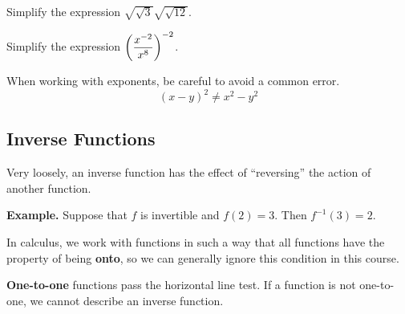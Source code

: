 \documentclass[12pt]{article}
\begin{document}
\Example Simplify the expression $\sqrt{\sqrt{3}}\sqrt{\sqrt{12}}$.

\newpage

\Example Simplify the expression $\displaystyle\left(\frac{x^{-2}}{x^8}\right)^{-2}$.

\vspace{20mm}

When working with exponents, be careful to avoid a common error.
$$(x-y)^2 \neq x^2-y^2$$

\vspace{5mm}

\subsection*{Inverse Functions}
Very loosely, an inverse function has the effect of ``reversing'' the action of another function.

\vspace{3mm}


\vspace{5mm}

\textbf{Example.} Suppose that $f$ is invertible and $f(2)=3$. Then $f^{-1}(3)=2$.

\vspace{5mm}


\vspace{5mm}

In calculus, we work with functions in such a way that all functions have the property of being \textbf{onto}, so we can generally ignore this condition in this course.

\vspace{3mm}

\textbf{One-to-one} functions pass the horizontal line test. If a function is not one-to-one, we cannot describe an inverse function.
\end{document}
